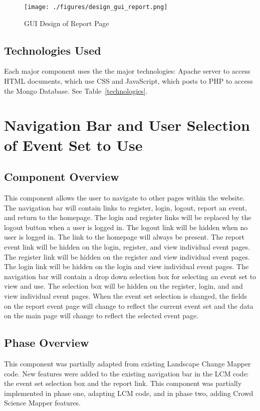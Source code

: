 \begin{figure}[!htb]
\begin{center}
\texttt{[image: ./figures/design\_gui\_report.png]}
\end{center}
\caption{GUI Design of Report Page \label{design_gui_report}}
\end{figure}
 
 \subsection{Technologies  Used}
Each major component uses the the major technologies: Apache server to access HTML documents, which use CSS and JavaScript, which posts to PHP to access the Mongo Database. See Table~\ref{technologies}.  

\section{Navigation Bar and User Selection of Event Set to Use}

\subsection{Component  Overview}
This component allows the user to navigate to other pages within the website. The navigation bar will contain links to register, login, logout, report an event, and return to the homepage. The login and register links will be replaced by the logout button when a user is logged in. The logout link will be hidden when no user is logged in. The link to the homepage will always be present. The report event link will be hidden on the login, register, and view individual event pages. The register link will be hidden on the register and view individual event pages. The login link will be hidden on the login and view individual event pages. The navigation bar will contain a drop down selection box for selecting an event set to view and use. The selection box will be hidden on the register, login, and and view individual event pages. When the event set selection is changed, the fields on the report event page will change to reflect the current event set and the data on the main page will change to reflect the selected event page.

\subsection{Phase Overview}
This component was partially adapted from existing Landscape Change Mapper code. New features were added to the existing navigation bar in the LCM code: the event set selection box and the report link. This component was partially implemented in phase one, adapting LCM code, and in phase two, adding Crowd Science Mapper features.

